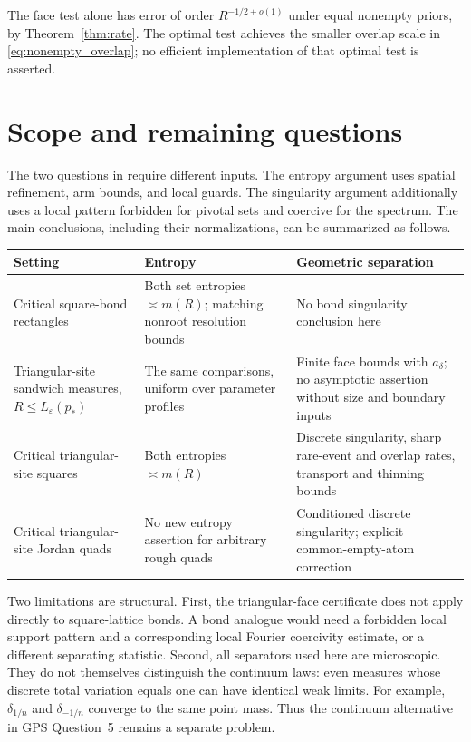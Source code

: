 \documentclass[11pt]{amsart}
\theoremstyle{remark}
\begin{document}
The face test alone has error of order $R^{-1/2+o(1)}$ under equal nonempty priors, by Theorem~\ref{thm:rate}. The optimal test achieves the smaller overlap scale in \eqref{eq:nonempty_overlap}; no efficient implementation of that optimal test is asserted.

\section{Scope and remaining questions}\label{sec:scope}

The two questions in \cite[Section~11]{GPS} require different inputs. The entropy argument uses spatial refinement, arm bounds, and local guards. The singularity argument additionally uses a local pattern forbidden for pivotal sets and coercive for the spectrum. The main conclusions, including their normalizations, can be summarized as follows.

\begin{center}
\small
\begin{tabularx}{\textwidth}{@{}>{\raggedright\arraybackslash}p{}>{\raggedright\arraybackslash}p{}>{\raggedright\arraybackslash}X@{}}
\hline
Setting & Entropy & Geometric separation\\
\hline
Critical square-bond rectangles & Both set entropies $\asymp m(R)$; matching nonroot resolution bounds & No bond singularity conclusion here\\[5pt]
Triangular-site sandwich measures, $R\le L_\varepsilon(p_*)$ & The same comparisons, uniform over parameter profiles & Finite face bounds with $a_\delta$; no asymptotic assertion without size and boundary inputs\\[5pt]
Critical triangular-site squares & Both entropies $\asymp m(R)$ & Discrete singularity, sharp rare-event and overlap rates, transport and thinning bounds\\[5pt]
Critical triangular-site Jordan quads & No new entropy assertion for arbitrary rough quads & Conditioned discrete singularity; explicit common-empty-atom correction\\
\hline
\end{tabularx}
\end{center}

Two limitations are structural. First, the triangular-face certificate does not apply directly to square-lattice bonds. A bond analogue would need a forbidden local support pattern and a corresponding local Fourier coercivity estimate, or a different separating statistic. Second, all separators used here are microscopic. They do not themselves distinguish the continuum laws: even measures whose discrete total variation equals one can have identical weak limits. For example, $\delta_{1/n}$ and $\delta_{-1/n}$ converge to the same point mass. Thus the continuum alternative in GPS Question~5 remains a separate problem.
\end{document}
